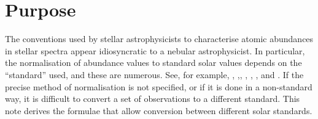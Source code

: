 \section{Purpose}

The conventions used by stellar astrophysicists to characterise atomic abundances in stellar spectra appear idiosyncratic to a nebular astrophysicist.  In particular, the normalisation of abundance values to standard solar values depends on the ``standard'' used, and these are numerous. See, for example, \cite{Anders_1989}, \cite{Grevesse_1998},\cite{Grevesse_2007}, \cite{Asplund_2009}, \cite{Grevesse_2010}, \cite{Scott_2014}, and \cite{Grevesse_2014}.  If the precise method of normalisation is not specified, or if it is done in a non-standard way, it is difficult to convert a set of observations to a different standard.  This note derives the formulae that allow conversion between different solar standards.
  